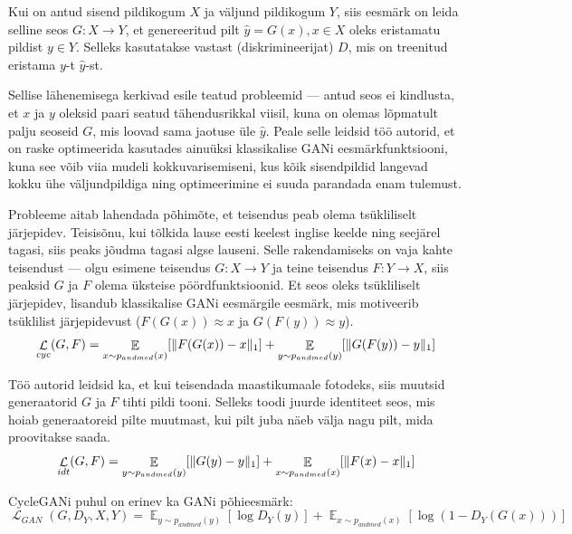 \documentclass{vilgym}
\DeclareMathOperator{\EX}{\mathbb{E}}
\DeclareMathOperator{\loss}{\mathcal{L}}
\DeclarePairedDelimiter{\norm}{\lVert}{\rVert}
\begin{document}
	Kui on antud sisend pildikogum $ X $ ja väljund pildikogum $ Y $, siis eesmärk on leida selline seos $ G: X \rightarrow Y $, et genereeritud pilt $ \hat{y} = G(x), x \in X $ oleks eristamatu pildist $ y \in Y $. Selleks kasutatakse vastast (diskrimineerijat) $ D $, mis on treenitud eristama $ y $-t $ \hat{y} $-st. 

	Sellise lähenemisega kerkivad esile teatud probleemid --- antud seos ei kindlusta, et $ x $ ja $ y $ oleksid paari seatud tähendusrikkal viisil, kuna on olemas lõpmatult palju seoseid $ G $, mis loovad sama jaotuse üle $ \hat{y} $. Peale selle leidsid töö autorid, et on raske optimeerida kasutades ainuüksi klassikalise GANi eesmärkfunktsiooni, kuna see võib viia mudeli kokkuvarisemiseni, kus kõik sisendpildid langevad kokku ühe väljundpildiga ning optimeerimine ei suuda parandada enam tulemust.

	Probleeme aitab lahendada põhimõte, et teisendus peab olema tsükliliselt järjepidev. Teisisõnu, kui tõlkida lause eesti keelest inglise keelde ning seejärel tagasi, siis peaks jõudma tagasi algse lauseni. Selle rakendamiseks on vaja kahte teisendust --- olgu esimene teisendus $ G\colon X \rightarrow Y $ ja teine teisendus $ F\colon Y \rightarrow X $, siis peaksid $ G $ ja $ F $ olema üksteise pöördfunktsioonid. Et seos oleks tsükliliselt järjepidev, lisandub klassikalise GANi eesmärgile eesmärk, mis motiveerib tsüklilist järjepidevust ($ F(G(x)) \approx x $ ja $ G(F(y)) \approx y $).
	\begin{equation}
		\loss_{cyc}(G,F) = \EX_{x\sim p_{andmed}(x)}[\norm{F(G(x)) - x}_1] + \EX_{y\sim p_{andmed}(y)}[\norm{G(F(y)) - y}_1]
	\end{equation}

	Töö autorid leidsid ka, et kui teisendada maastikumaale fotodeks, siis muutsid generaatorid $ G $ ja $ F $ tihti pildi tooni. Selleks toodi	juurde identiteet seos, mis hoiab generaatoreid pilte muutmast, kui pilt juba näeb välja nagu pilt, mida proovitakse saada.
	\begin{equation} \label{eq:idt}
		\loss_{idt}(G,F) = \EX_{y\sim p_{andmed}(y)}[\norm{G(y) - y}_1] + \EX_{x\sim p_{andmed}(x)}[\norm{F(x) - x}_1]
	\end{equation}

	CycleGANi puhul on erinev ka GANi põhieesmärk:
	\begin{equation}
		\loss_{GAN}(G,D_Y, X, Y) = \EX_{y\sim p_{andmed}(y)}[\log D_Y(y)] + \EX_{x\sim p_{andmed}(x)}[\log(1-D_Y(G(x)))]
	\end{equation}
	
\end{document}
